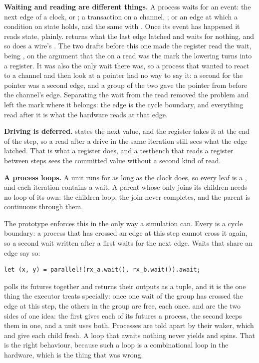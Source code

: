 \textbf{Waiting and reading are different things.} A process waits for
an event: the next edge of a clock,  or
; a transaction on a channel, ; or
an edge at which a condition on state holds,  and the same with . Once its event has happened it reads
state, plainly.  returns what the last edge latched and
waits for nothing, and so does a wire's . The two drafts
before this one made the register read the wait,  being
, on the argument that the  on a read was the
mark the lowering turns into a register. It was also the only wait
there was, so a process that wanted to react to a channel and then
look at a pointer had no way to say it: a second  for the
pointer was a second edge, and a group of the two gave the pointer
from before the channel's edge. Separating the wait from the read
removed the problem and left the mark where it belongs: the edge is
the cycle boundary, and everything read after it is what the hardware
reads at that edge.

\textbf{Driving is deferred.}  states the next value, and the
register takes it at the end of the step, so a read after a drive in
the same iteration still sees what the edge latched. That is what a
register does, and a testbench that reads a register between steps
sees the committed value without a second kind of read.

\textbf{A process loops.} A unit runs for as long as the clock does, so
every leaf  is a , and each iteration contains a
wait. A parent whose  only joins its children needs no loop
of its own: the children loop, the join never completes, and the
parent is continuous through them.

The prototype enforces this in the only way a simulation can. Every
 is a cycle boundary: a process that has crossed an edge
at this step cannot cross it again, so a second wait written after a
first waits for the next edge. Waits that share an edge say so:

\begin{lstlisting}[caption={Two events at one edge are written inside \code{parallel!}. Written one after the other, they would be two edges, as any two awaits are.},label={lst:parallel}]
let (x, y) = parallel!(rx_a.wait(), rx_b.wait()).await;
\end{lstlisting}

 polls its futures together and returns their outputs
as a tuple, and it is the one thing the executor treats specially: once
one wait of the group has crossed the edge at this step, the others in
the group are free, each once.  and  are the
two sides of one idea: the first gives each of its futures a process,
the second keeps them in one, and a unit uses both. Processes are told
apart by their waker, which  and  give each
child fresh. A loop that awaits nothing never yields and spins. That is
the right behaviour, because such a loop is a combinational loop in
the hardware, which is the thing that was wrong.

